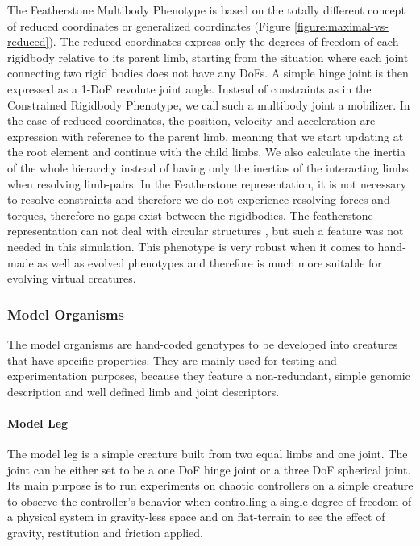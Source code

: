\documentclass[main]{subfiles}
\begin{document}
The Featherstone Multibody Phenotype is based on the totally different concept of reduced coordinates or generalized coordinates (Figure \ref{figure:maximal-vs-reduced}). %
%
The reduced coordinates express only the degrees of freedom of each rigidbody relative to its parent limb, starting from the situation where each joint connecting two rigid bodies does not have any DoFs. %
%
A simple hinge joint is then expressed as a 1-DoF revolute joint angle. Instead of constraints as in the Constrained Rigidbody Phenotype, we call such a multibody joint a mobilizer. %
%
In the case of reduced coordinates, the position, velocity and acceleration are expression with reference to the parent limb, meaning that we start updating at the root element and continue with the child limbs. %
%
We also calculate the inertia of the whole hierarchy instead of having only the inertias of the interacting limbs when resolving limb-pairs. %
%
In the Featherstone representation, it is not necessary to resolve constraints and therefore we do not experience resolving forces and torques, therefore no gaps exist between the rigidbodies. %
%
The featherstone representation can not deal with circular structures \cite{bib::Coumans2014}, but such a feature was not needed in this simulation. %
%
This phenotype is very robust when it comes to hand-made as well as evolved phenotypes and therefore is much more suitable for evolving virtual creatures. 

\subsubsection{Model Organisms}

The model organisms are hand-coded genotypes to be developed into creatures that have specific properties. %
%
They are mainly used for testing and experimentation purposes, because they feature a non-redundant, simple genomic description and well defined limb and joint descriptors.

\paragraph{Model Leg}

The model leg is a simple creature built from two equal limbs and one joint. %
%
The joint can be either set to be a one DoF hinge joint or a three DoF spherical joint. %
%
Its main purpose is to run experiments on chaotic controllers on a simple creature to observe the controller's behavior when controlling a single degree of freedom of a physical system in gravity-less space and on flat-terrain to see the effect of gravity, restitution and friction applied.
\end{document}
